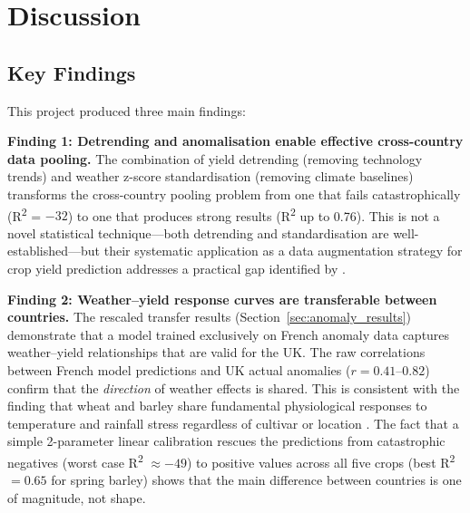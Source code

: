 \documentclass[12pt,a4paper]{report}
\newcommand{\rsq}{R\textsuperscript{2}}
\begin{document}


\chapter{Discussion}

\section{Key Findings}

This project produced three main findings:

\textbf{Finding 1: Detrending and anomalisation enable effective cross-country data pooling.} The combination of yield detrending (removing technology trends) and weather z-score standardisation (removing climate baselines) transforms the cross-country pooling problem from one that fails catastrophically (\rsq{} = $-32$) to one that produces strong results (\rsq{} up to 0.76). This is not a novel statistical technique---both detrending \citep{moore2015} and standardisation are well-established---but their systematic application as a data augmentation strategy for crop yield prediction addresses a practical gap identified by \citet{corcoran2023}.

\textbf{Finding 2: Weather--yield response curves are transferable between countries.} The rescaled transfer results (Section~\ref{sec:anomaly_results}) demonstrate that a model trained exclusively on French anomaly data captures weather--yield relationships that are valid for the UK. The raw correlations between French model predictions and UK actual anomalies ($r = 0.41$--$0.82$) confirm that the \emph{direction} of weather effects is shared. This is consistent with the finding that wheat and barley share fundamental physiological responses to temperature and rainfall stress regardless of cultivar or location \citep{challinor2014}. The fact that a simple 2-parameter linear calibration rescues the predictions from catastrophic negatives (worst case \rsq{} $\approx -49$) to positive values across all five crops (best \rsq{} $= 0.65$ for spring barley) shows that the main difference between countries is one of magnitude, not shape.
\end{document}
